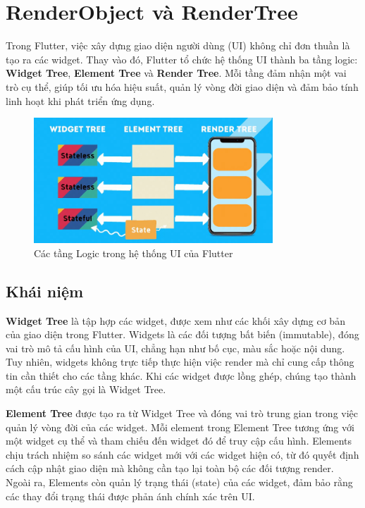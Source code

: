 \documentclass[../DoAn.tex]{subfiles}
\numberwithin{figure}{chapter}
\begin{document}
\section{RenderObject và RenderTree}
Trong Flutter, việc xây dựng giao diện người dùng (UI) không chỉ đơn thuần là tạo ra các widget. Thay vào đó, Flutter tổ chức hệ thống UI thành ba tầng logic: \textbf{Widget Tree}, \textbf{Element Tree} và \textbf{Render Tree}. Mỗi tầng đảm nhận một vai trò cụ thể, giúp tối ưu hóa hiệu suất, quản lý vòng đời giao diện và đảm bảo tính linh hoạt khi phát triển ứng dụng.

\begin{figure}[H]
    \centering
    \includegraphics[width=0.8\textwidth]{Hinhve/Chuong5/treeflutter.png}
    \caption{Các tầng Logic trong hệ thống UI của Flutter}
    \label{fig:treeflutter}
\end{figure}

\subsection{Khái niệm}

\textbf{Widget Tree} là tập hợp các widget, được xem như các khối xây dựng cơ bản của giao diện trong Flutter. Widgets là các đối tượng bất biến (immutable), đóng vai trò mô tả cấu hình của UI, chẳng hạn như bố cục, màu sắc hoặc nội dung. Tuy nhiên, widgets không trực tiếp thực hiện việc render mà chỉ cung cấp thông tin cần thiết cho các tầng khác. Khi các widget được lồng ghép, chúng tạo thành một cấu trúc cây gọi là Widget Tree.

\textbf{Element Tree} được tạo ra từ Widget Tree và đóng vai trò trung gian trong việc quản lý vòng đời của các widget. Mỗi element trong Element Tree tương ứng với một widget cụ thể và tham chiếu đến widget đó để truy cập cấu hình. Elements chịu trách nhiệm so sánh các widget mới với các widget hiện có, từ đó quyết định cách cập nhật giao diện mà không cần tạo lại toàn bộ các đối tượng render. Ngoài ra, Elements còn quản lý trạng thái (state) của các widget, đảm bảo rằng các thay đổi trạng thái được phản ánh chính xác trên UI.
\end{document}
